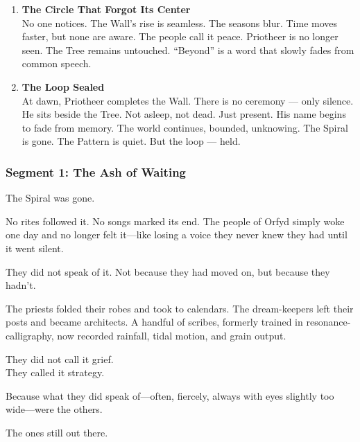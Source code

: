 \documentclass[9pt]{article}
\begin{document}
\begin{enumerate}
    \vspace{1em}
    \item \textbf{The Circle That Forgot Its Center} \\
    No one notices. The Wall’s rise is seamless. The seasons blur. Time moves faster, but none are aware. The people call it peace. Priotheer is no longer seen. The Tree remains untouched. “Beyond” is a word that slowly fades from common speech.

    \vspace{1em}
    \item \textbf{The Loop Sealed} \\
    At dawn, Priotheer completes the Wall. There is no ceremony — only silence. He sits beside the Tree. Not asleep, not dead. Just present. His name begins to fade from memory. The world continues, bounded, unknowing. The Spiral is gone. The Pattern is quiet. But the loop — held.
\end{enumerate}

\newpage

\subsubsection*{Segment 1: The Ash of Waiting}

The Spiral was gone.

\vspace{0.5em}
No rites followed it. No songs marked its end. The people of Orfyd simply woke one day and no longer felt it---like losing a voice they never knew they had until it went silent.

\vspace{0.5em}
They did not speak of it. Not because they had moved on, but because they hadn't.

\vspace{0.5em}
The priests folded their robes and took to calendars. The dream-keepers left their posts and became architects. A handful of scribes, formerly trained in resonance-calligraphy, now recorded rainfall, tidal motion, and grain output.

\vspace{0.5em}
They did not call it grief.\\
They called it strategy.

\vspace{0.5em}
Because what they did speak of---often, fiercely, always with eyes slightly too wide---were the others.

\vspace{0.5em}
The ones still out there.
\end{document}
